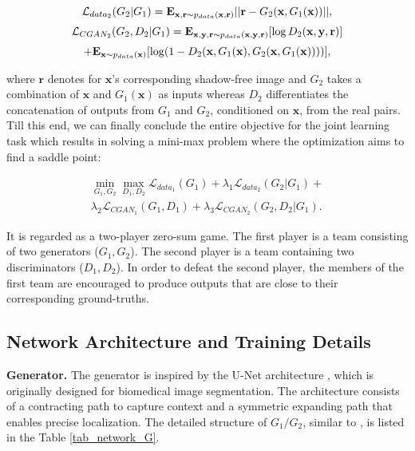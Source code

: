 \documentclass[10pt,twocolumn,letterpaper]{article}
\begin{document}
\begin{equation}
\vspace{+5pt}
\small{\mathcal{L}_{data_2}(G_2 | G_1)= \mathbf{E}_{\mathbf{x}, \mathbf{r} \sim p_{data}(\mathbf{x}, \mathbf{r})} ||\mathbf{r} - G_2(\mathbf{x}, G_1(\mathbf{x}))||,}
\vspace{+15pt}
\end{equation}
\vspace{-15pt}
\begin{equation}
\small{\mathcal{L}_{CGAN_2}(G_2,  D_2 | G_1)= \mathbf{E}_{\mathbf{x}, \mathbf{y}, \mathbf{r} \sim p_{data}(\mathbf{x}, \mathbf{y}, \mathbf{r})}[\log {D_2(\mathbf{x}, \mathbf{y}, \mathbf{r})}]}\nonumber 
\end{equation}
\begin{equation}
+\mathbf{E}_{\mathbf{x} \sim p_{data}(\mathbf{x})}[\log ({1 - \tiny{D_2(\mathbf{x}}, G_1(\mathbf{x}), G_2(\mathbf{x}, G_1(\mathbf{x})))})],
\label{eqa_CGAN2_simple}
\end{equation}

where $\mathbf{r}$ denotes for $\mathbf{x}$'s corresponding shadow-free image and $G_2$ takes a combination of $\mathbf{x}$ and $G_1(\mathbf{x})$ as inputs whereas $D_2$ differentiates the concatenation of outputs from $G_1$ and $G_2$, conditioned on $\mathbf{x}$, from the real pairs. Till this end, we can finally conclude the entire objective for the joint learning task which results in solving a mini-max problem where the optimization aims to find a saddle point:

\vspace{-10pt}
\begin{eqnarray}
\min\limits_{G_1, G_2} \max\limits_{D_1, D_2} \mathcal{L}_{data_1}(G_1) + \lambda_1 \mathcal{L}_{data_2}(G_2 | G_1) + \nonumber\\ 
\lambda_2 \mathcal{L}_{CGAN_1}(G_1,  D_1) + \lambda_3 \mathcal{L}_{CGAN_2}(G_2,  D_2 | G_1).
\end{eqnarray}



It is regarded as a two-player zero-sum game. The first player is a team consisting of two generators ($G_1,G_2$). The second player is a team containing two discriminators ($D_1,D_2$). In order to defeat the second player, the members of the first team are encouraged to produce outputs that are close to their corresponding ground-truths. 


\subsection{Network Architecture and Training Details}
\noindent \textbf{Generator.} The generator is inspired by the U-Net architecture \cite{ronneberger2015u}, which is originally designed for biomedical image segmentation. The architecture consists of a contracting path to capture context and a symmetric expanding path that enables precise localization. The detailed structure of $G_1/G_2$, similar to \cite{isola2016image}, is listed in the Table \ref{tab_network_G}.
\end{document}
